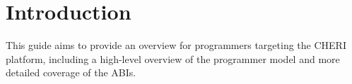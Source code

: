 \section{Introduction}

This guide aims to provide an overview for programmers targeting the CHERI platform, including a high-level overview of the programmer model and more detailed coverage of the ABIs.  
